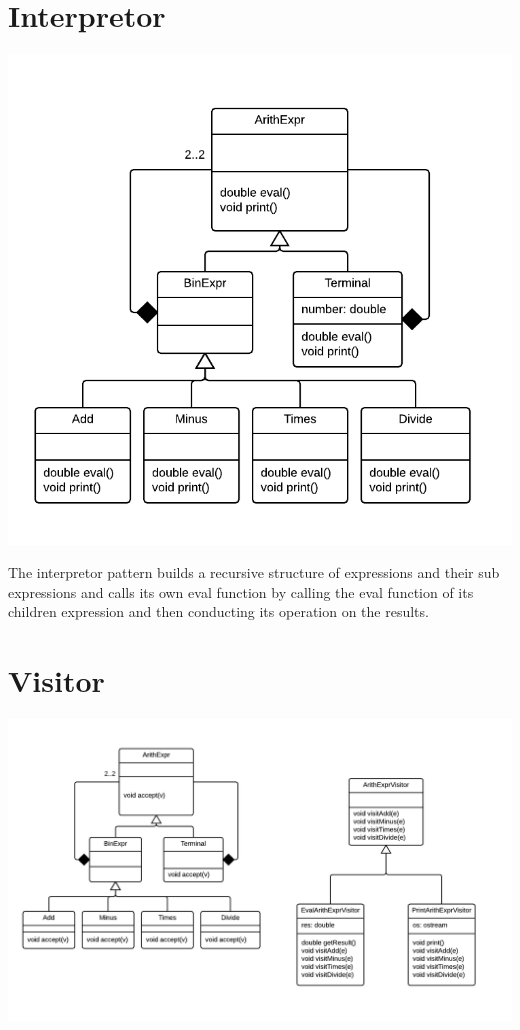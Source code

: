 \documentclass{article}
\begin{document}
\section*{Interpretor} %
\label{sec:interpretor}
\includegraphics[width=7in]{interpretor.png}

The interpretor pattern builds a recursive structure of expressions and their sub expressions and calls its own eval function by calling the eval function of its children expression and then conducting its operation on the results.

\newpage
\section*{Visitor} %
\label{sec:visitor}
\includegraphics[width=7in]{visitor.png}
\end{document}
